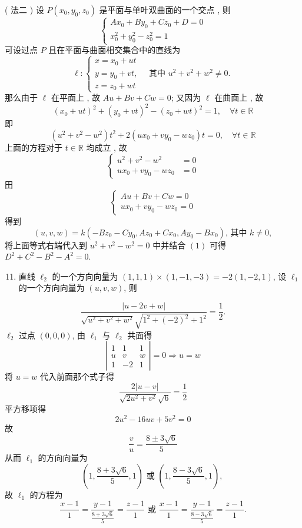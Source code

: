 \documentclass[10pt]{article}
\begin{document}
( 法二 )  设  $P\left(x_{0}, y_{0}, z_{0}\right)$  是平面与单叶双曲面的一个交点 ,  则 
$$
\left\{\begin{array}{r}
A x_{0}+B y_{0}+C z_{0}+D=0 \\
x_{0}^{2}+y_{0}^{2}-z_{0}^{2}=1
\end{array}\right.
$$
 可设过点  $P$  且在平面与曲面相交集合中的直线为 
$$
\ell:\left\{\begin{array}{l}
x=x_{0}+u t \\
y=y_{0}+v t, \quad \text { 其中 } u^{2}+v^{2}+w^{2} \neq 0 . \\
z=z_{0}+w t
\end{array}\right.
$$
 那么由于  $\ell$  在平面上 ,  故  $A u+B v+C w=0$;  又因为  $\ell$  在曲面上 ,  故 
$$
\left(x_{0}+u t\right)^{2}+\left(y_{0}+v t\right)^{2}-\left(z_{0}+w t\right)^{2}=1, \quad \forall t \in \mathbb{R}
$$
 即 
$$
\left(u^{2}+v^{2}-w^{2}\right) t^{2}+2\left(u x_{0}+v y_{0}-w z_{0}\right) t=0, \quad \forall t \in \mathbb{R}
$$
 上面的方程对于  $t \in \mathbb{R}$  均成立 ,  故 
$$
\left\{\begin{aligned}
u^{2}+v^{2}-w^{2} &=0 \\
u x_{0}+v y_{0}-w z_{0} &=0
\end{aligned}\right.
$$
 田 
$$
\left\{\begin{array}{r}
A u+B v+C w=0 \\
u x_{0}+v y_{0}-w z_{0}=0
\end{array}\right.
$$
 得到 
$$
(u, v, w)=k\left(-B z_{0}-C y_{0}, A z_{0}+C x_{0}, A y_{0}-B x_{0}\right) \text {, 其中 } k \neq 0,
$$
 将上面等式右端代入到  $u^{2}+v^{2}-w^{2}=0$  中并结合  $(1)$  可得  $D^{2}+C^{2}-B^{2}-A^{2}=0$.

\begin{enumerate}
  \setcounter{enumi}{10}
  \item  直线  $\ell_{2}$  的一个方向向量为  $(1,1,1) \times(1,-1,-3)=-2(1,-2,1)$,  设  $\ell_{1}$  的一个方向向量为  $(u, v, w)$,  则 
\end{enumerate}
$$
\frac{|u-2 v+w|}{\sqrt{u^{2}+v^{2}+w^{2}} \sqrt{1^{2}+(-2)^{2}}+1^{2}}=\frac{1}{2} .
$$
$\ell_{2}$  过点  $(0,0,0)$,  由  $\ell_{1}$  与  $\ell_{2}$  共面得 
$$
\left|\begin{array}{ccc}
1 & 1 & 1 \\
u & v & w \\
1 & -2 & 1
\end{array}\right|=0 \Longrightarrow u=w
$$
 将  $u=w$  代入前面那个式子得 
$$
\frac{2|u-v|}{\sqrt{2 u^{2}+v^{2}} \sqrt{6}}=\frac{1}{2}
$$
 平方移项得 
$$
2 u^{2}-16 u v+5 v^{2}=0
$$
 故 
$$
\frac{v}{u}=\frac{8 \pm 3 \sqrt{6}}{5}
$$
 从而  $\ell_{1}$  的方向向量为 
$$
\left(1, \frac{8+3 \sqrt{6}}{5}, 1\right) \text { 或 }\left(1, \frac{8-3 \sqrt{6}}{5}, 1\right) \text {, }
$$
 故  $\ell_{1}$  的方程为 
$$
\frac{x-1}{1}=\frac{y-1}{\frac{8+3 \sqrt{6}}{5}}=\frac{z-1}{1} \text { 或 } \frac{x-1}{1}=\frac{y-1}{\frac{8-3 \sqrt{6}}{5}}=\frac{z-1}{1} .
$$
\end{document}
